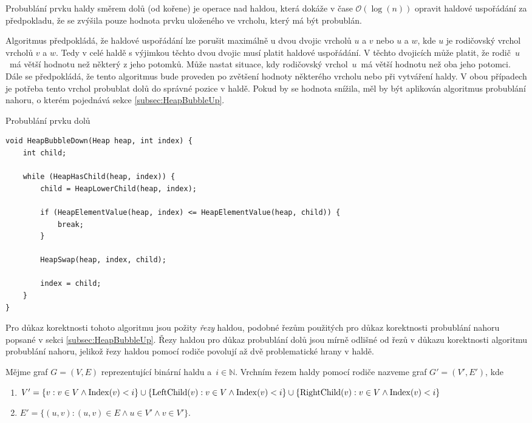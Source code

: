 Probublání prvku haldy směrem dolů (od kořene) je operace nad haldou, která dokáže v čase $\mathcal{O}(\log(n))$ opravit haldové uspořádání za předpokladu, že se zvýšila pouze hodnota prvku uloženého ve vrcholu, který má být probublán.

Algoritmus předpokládá, že haldové uspořádání lze porušit maximálně u dvou dvojic vrcholů $u$ a $v$ nebo $u$ a $w$, kde $u$ je rodičovský vrchol vrcholů $v$ a $w$. Tedy v celé haldě s výjimkou těchto dvou dvojic musí platit haldové uspořádání. V těchto dvojicích může platit, že rodič~$u$~má větší hodnotu než některý z jeho potomků. Může nastat situace, kdy rodičovský vrchol~$u$~má větší hodnotu než oba jeho potomci. Dále se předpokládá, že tento algoritmus bude proveden po zvětšení hodnoty některého vrcholu nebo při vytváření haldy. V obou případech je potřeba tento vrchol probublat dolů do správné pozice v haldě. Pokud by se hodnota snížila, měl by být aplikován algoritmus probublání nahoru, o kterém pojednává sekce \ref{subsec:HeapBubbleUp}.


\begin{listing}[H]
	\caption{Probublání prvku dolů}
	\label{list:HeapBubbleDown}
	\begin{verbatim}
void HeapBubbleDown(Heap heap, int index) {
    int child;

    while (HeapHasChild(heap, index)) {
        child = HeapLowerChild(heap, index);

        if (HeapElementValue(heap, index) <= HeapElementValue(heap, child)) {
            break;
        }

        HeapSwap(heap, index, child);

        index = child;
    }
}
	\end{verbatim}
\end{listing}

Pro důkaz korektnosti tohoto algoritmu jsou požity \textit{řezy} haldou, podobné řezům použitých pro důkaz korektnosti probublání nahoru popsané v sekci \ref{subsec:HeapBubbleUp}. Řezy haldou pro důkaz probublání dolů jsou mírně odlišné od řezů v důkazu korektnosti algoritmu probublání nahoru, jelikož řezy haldou pomocí rodiče povolují až dvě problematické hrany v haldě.

\begin{definition}
	Mějme graf $G = (V, E)$ reprezentující binární haldu a~$i \in \mathbb{N}$.
	Vrchním řezem haldy pomocí rodiče nazveme graf $G' = (V', E')$, kde
	\begin{enumerate}
	  \item[] $V' = \{ v: v \in V \land \operatorname{Index}(v) < i \} \cup \{ \operatorname{LeftChild}(v): v \in V \land \operatorname{Index}(v) < i \} \cup \{ \operatorname{RightChild}(v): v \in V \land \operatorname{Index}(v) < i \}$
	  \item[] $E' = \{ (u, v): (u, v) \in E \land u \in V' \land v \in V' \}$.
	\end{enumerate}
\end{definition}

